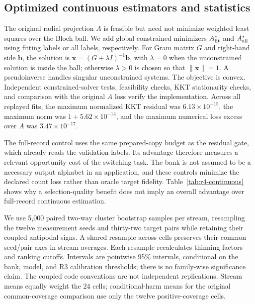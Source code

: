 \documentclass[11pt]{article}
\numberwithin{equation}{section}
\begin{document}
\subsection{Optimized continuous estimators and statistics}

The original radial projection $A$ is feasible but need not minimize
weighted least squares over the Bloch ball.  We add global constrained
minimizers $A^*_{\rm fit}$ and $A^*_{\rm all}$ using fitting labels or
all labels, respectively.  For Gram matrix $G$ and right-hand side
$\boldsymbol b$, the solution is
$\boldsymbol x=(G+\lambda I)^{-1}\boldsymbol b$, with $\lambda=0$
when the unconstrained solution is inside the ball; otherwise $\lambda>0$
is chosen so that $\|\boldsymbol x\|=1$.
A pseudoinverse handles singular unconstrained systems.  The objective is
convex.  Independent constrained-solver tests, feasibility checks, KKT
stationarity checks, and comparison with the original $A$ loss verify the
implementation.  Across all replayed fits, the maximum normalized KKT
residual was $6.13\times10^{-15}$, the maximum norm was
$1+5.62\times10^{-14}$, and the maximum numerical loss excess over $A$
was $3.47\times10^{-17}$.

The full-record control uses the same prepared-copy budget as the residual
gate, which already reads the validation labels.  Its advantage therefore
measures a relevant opportunity cost of the switching task.  The bank is
not assumed to be a necessary output alphabet in an application, and these
controls minimize the declared count loss rather than oracle target fidelity.
Table~\ref{tab:r4-continuous} shows why a selection-quality benefit does
not imply an overall advantage over full-record continuous estimation.

We use 5,000 paired two-way cluster bootstrap samples per stream, resampling
the twelve measurement seeds and thirty-two target pairs while retaining
their coupled antipodal signs.  A shared resample across cells preserves
their common seed/pair axes in stream averages.  Each resample recalculates
thinning factors and ranking cutoffs.  Intervals are pointwise 95\% intervals,
conditional on the bank, model, and R3 calibration thresholds; there is no
family-wise significance claim.  The coupled code conventions are not
independent replications.  Stream means equally weight the 24 cells;
conditional-harm means for the original common-coverage comparison use only
the twelve positive-coverage cells.
\end{document}
